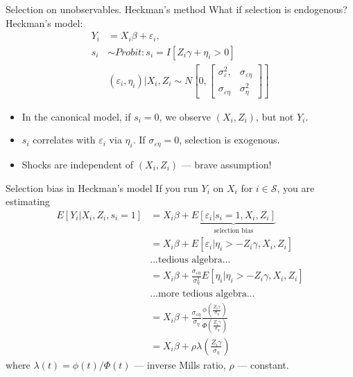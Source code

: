\documentclass[pdftex]{beamer}
\begin{document}
\begin{frame}{Selection on unobservables. Heckman's method}
	What if selection is endogenous? Heckman's model:
	\begin{align*}
		Y_i &= X_i\beta + \varepsilon_i,\\
		s_i &\sim Probit: s_i = I[Z_i\gamma + \eta_i > 0]\\
		&(\varepsilon_i, \eta_i)|X_i,Z_i\sim{}N\left[0, \left[\begin{array}{cc}
			\sigma_\varepsilon^2, & \sigma_{\varepsilon\eta}\\
			\sigma_{\varepsilon\eta} & \sigma_{\eta}^2
		\end{array}\right]\right]
	\end{align*}
	\begin{itemize}
		\item{}In the canonical model, if $s_i=0$, we observe $(X_i, Z_i)$, but not $Y_i$.
		\item{}$s_i$ correlates with $\varepsilon_i$ via $\eta_i$. If $\sigma_{\varepsilon\eta} = 0$, selection is exogenous.
		\item{}Shocks are independent of $(X_i, Z_i)$ --- brave assumption!
	\end{itemize}
	
\end{frame}

\begin{frame}{Selection bias in Heckman's model}
	If you run $Y_i$ on $X_i$ for $i\in\mathcal{S}$, you are estimating
	\begin{align*}
		E[Y_i|X_i,Z_i, s_i=1] &= X_i\beta + \underbrace{E[\varepsilon_i| s_i=1, X_i,Z_i]}_{\text{selection bias}}\\
		&= X_i\beta + E[\varepsilon_i| \eta_i > -Z_i\gamma, X_i,Z_i]\\
		&\text{...tedious algebra...}\\
		&= X_i\beta + \frac{\sigma_{\varepsilon\eta}}{\sigma_\eta^2}E[\eta_i| \eta_i > -Z_i\gamma, X_i,Z_i]\\
		&\text{...more tedious algebra...}\\
		&= X_i\beta + \frac{\sigma_{\varepsilon\eta}}{\sigma_\eta}\frac{\phi\left(\frac{Z_i\gamma}{\sigma_\eta}\right)}{\Phi\left(\frac{Z_i\gamma}{\sigma_\eta}\right)}\\
		&= X_i\beta + \rho\lambda\left(\frac{Z_i\gamma}{\sigma_\eta}\right)
	\end{align*}
	where $\lambda(t) = \phi(t)/\Phi(t)$ --- inverse Mills ratio, $\rho$ --- constant.
\end{frame}
\end{document}
